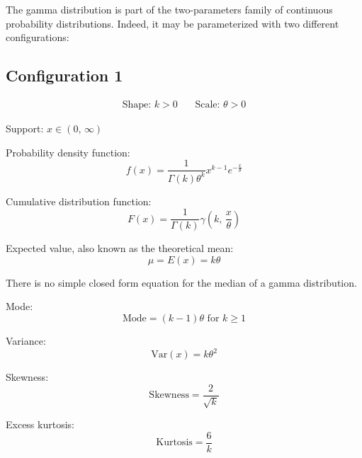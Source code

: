 \documentclass[12pt]{article}
\begin{document}
\singlespacing

\tableofcontents\pagebreak
\doublespacing
The gamma distribution is part of the two-parameters family of continuous probability distributions. Indeed, it may be
parameterized with two different configurations\cite{wikipediaGammaDistribution2022}:
\subsection{Configuration 1}
\begin{align*}
	\text{Shape: } k>0&&\, \text{Scale: }\theta>0
\end{align*}

Support: $x\in (0,\,\infty)$

Probability density function:
\begin{equation}\label{eq:gamma-pdf-1}
	f(x) = \frac{1}{\Gamma(k)\theta^k}x^{k-1}e^{-\frac{x}{\theta}}
\end{equation}

Cumulative distribution function:
\begin{equation}\label{eq:gamma-cdf-1}
	F(x) = \frac{1}{\Gamma(k)}\gamma (k,\,\frac{x}{\theta})
\end{equation}

Expected value, also known as the theoretical mean:
\begin{equation}\label{eq:gamma-expected-value-1}
	\mu = E(x) = k\theta
\end{equation}

There is no simple closed form equation for the median of a gamma distribution.

Mode:
\begin{equation}\label{eq:gamma-mode-1}
	\text{Mode} = (k-1)\theta\text{ for }k \geq 1
\end{equation}

Variance:
\begin{equation}\label{eq:gamma-variance-1}
	\text{Var}(x) = k\theta^2
\end{equation}

Skewness:
\begin{equation}\label{eq:gamma-skewness-1}
	\text{Skewness} = \frac{2}{\sqrt{k}}
\end{equation}

Excess kurtosis:
\begin{equation}\label{eq:gamma-kurtosis-1}
	\text{Kurtosis} = \frac{6}{k}
\end{equation}
\end{document}
